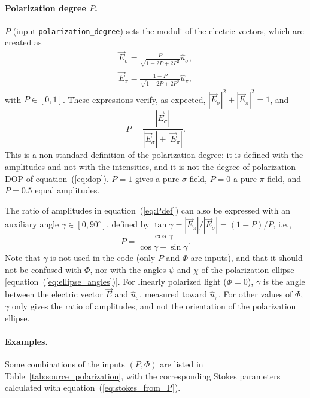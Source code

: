 \documentclass{iucr}
\begin{document}
\paragraph{Polarization degree $P$.}
$P$ (input {\tt polarization\_degree}) sets the moduli of the electric vectors, which are created as
\begin{eqnarray}\label{eq:EfromP}
   \vec{E}_\sigma = \frac{P}{\sqrt{1-2 P+ 2 P^2}} \hat{u}_\sigma, \nonumber \\
   \vec{E}_\pi    = \frac{1-P}{\sqrt{1-2 P+ 2 P^2}} \hat{u}_\pi,
\end{eqnarray}
with $P\in[0,1]$. These expressions verify, as expected, $|\vec{E}_\sigma|^2 + |\vec{E}_\pi|^2 = 1$, and
\begin{equation}\label{eq:Pdef}
   P=\frac{|\vec{E}_\sigma|}{|\vec{E}_\sigma|+|\vec{E}_\pi|}.
\end{equation}
This is a non-standard definition of the polarization degree: it is defined with the amplitudes and not with the intensities, and it is not the degree of polarization DOP of equation~(\ref{eq:dop}). $P=1$ gives a pure $\sigma$ field, $P=0$ a pure $\pi$ field, and $P=0.5$ equal amplitudes.

The ratio of amplitudes in equation~(\ref{eq:Pdef}) can also be expressed with an auxiliary angle $\gamma\in[0,90^\circ]$, defined by $\tan\gamma=|\vec{E}_\pi|/|\vec{E}_\sigma|=(1-P)/P$, i.e.,
\begin{equation}
   P = \frac{\cos \gamma}{\cos \gamma + \sin \gamma}.
\end{equation}
Note that $\gamma$ is not used in the code (only $P$ and $\Phi$ are inputs), and that it should not be confused with $\Phi$, nor with the angles $\psi$ and $\chi$ of the polarization ellipse [equation~(\ref{eq:ellipse_angles})]. For linearly polarized light ($\Phi=0$), $\gamma$ is the angle between the electric vector $\vec{E}$ and $\hat{u}_\sigma$, measured toward $\hat{u}_\pi$. For other values of $\Phi$, $\gamma$ only gives the ratio of amplitudes, and not the orientation of the polarization ellipse.

\paragraph{Examples.}
Some combinations of the inputs $(P, \Phi)$ are listed in Table~\ref{tab:source_polarization}, with the corresponding Stokes parameters calculated with equation~(\ref{eq:stokes_from_P}).
\end{document}
